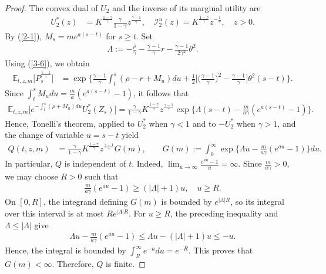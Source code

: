 \documentclass[a4paper,11pt]{amsart}
\numberwithin{equation}{section}
\begin{document}
{\begin{proof}
The convex dual of $U_2$ and the inverse of its marginal utility are
\begin{align*}
U_2^\ast(z)&=K^{\frac{1-\gamma}{\gamma}}\frac{\gamma}{1-\gamma}z^{\frac{\gamma-1}{\gamma}},\quad
\mathcal I_2^u(z)=K^{\frac{1-\gamma}{\gamma}}z^{-\frac{1}{\gamma}},\quad z>0.
\end{align*}
By (\ref{2-1}), $M_s=me^{a(s-t)}$ for $s\geq t$. Set
\begin{align*}
\Lambda:=-\frac{\rho}{\gamma}-\frac{\gamma-1}{\gamma}r-\frac{\gamma-1}{2\gamma^2}\theta^2.
\end{align*}
Using (\ref{3-6}), we obtain
\begin{align*}
\mathbb E_{t,z,m}\bigg[P_s^{\frac{\gamma-1}{\gamma}}\bigg]
&=\exp\bigg\{\frac{\gamma-1}{\gamma}\int_t^s(\rho-r+M_u)du
+\frac{1}{2}\bigg[\bigg(\frac{\gamma-1}{\gamma}\bigg)^2-\frac{\gamma-1}{\gamma}\bigg]\theta^2(s-t)\bigg\}.
\end{align*}
Since $\int_t^sM_udu=\frac{m}{a}(e^{a(s-t)}-1)$, it follows that
\begin{align*}
\mathbb E_{t,z,m}\bigg[e^{-\int_t^s(\rho+M_u)du}U_2^\ast(Z_s)\bigg]=\frac{\gamma}{1-\gamma}K^{\frac{1-\gamma}{\gamma}}z^{\frac{\gamma-1}{\gamma}}
\exp\bigg\{\Lambda(s-t)-\frac{m}{a\gamma}(e^{a(s-t)}-1)\bigg\}.
\end{align*}
Hence, Tonelli's theorem, applied to $U_2^\ast$ when $\gamma<1$ and to $-U_2^\ast$ when $\gamma>1$, and the change of variable $u=s-t$ yield
\begin{align}\label{w}
Q(t,z,m)&=\frac{\gamma}{1-\gamma}K^{\frac{1-\gamma}{\gamma}}z^{\frac{\gamma-1}{\gamma}}G(m),\qquad
G(m):=\int_0^\infty\exp\bigg\{\Lambda u-\frac{m}{a\gamma}(e^{au}-1)\bigg\}du.
\end{align}
In particular, $Q$ is independent of $t$. {\color{black}Indeed, $\lim_{u\to\infty}\frac{e^{au}-1}{u}=\infty$. Since $\frac{m}{a\gamma}>0$, we may choose $R>0$ such that
\begin{align*}
\frac{m}{a\gamma}(e^{au}-1)\geq(|\Lambda|+1)u,\quad u\geq R.
\end{align*}
On $[0,R]$, the integrand defining $G(m)$ is bounded by $e^{|\Lambda|R}$, so its integral over this interval is at most $Re^{|\Lambda|R}$. For $u\geq R$, the preceding inequality and $\Lambda\leq|\Lambda|$ give
\begin{align*}
\Lambda u-\frac{m}{a\gamma}(e^{au}-1)\leq\Lambda u-(|\Lambda|+1)u\leq-u.
\end{align*}
Hence, the integral is bounded by $\int_R^\infty e^{-u}du=e^{-R}$. This proves that $G(m)<\infty$. Therefore, $Q$ is finite.}


\end{proof}}
\end{document}
